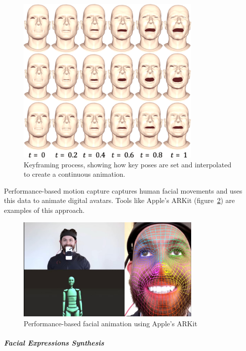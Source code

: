 \documentclass[../../main.tex]{subfiles}
\begin{document}
\begin{figure}
    \centering
    \includegraphics[width=0.8\textwidth]{chapters/background_work/images/facial_keyframing.png}
    \caption{Keyframing process, showing how key poses are set and interpolated to create a continuous animation.}
    \label{ch:facial_expressions:fig:keyframing}
\end{figure}

Performance-based motion capture captures human facial movements and uses this data to animate digital avatars. Tools like Apple's ARKit (figure~\ref{ch:facial_expressions:fig:motion_capture}) are examples of this approach.

\begin{figure}
    \centering
    \includegraphics[width=0.8\textwidth]{chapters/background_work/images/facial_motion_capture.jpg}
    \caption{Performance-based facial animation using Apple's ARKit}
    \label{ch:facial_expressions:fig:motion_capture}
\end{figure}

\subparagraph{Facial Expressions Synthesis}
\label{ch:background_work:sign_language_synthesis:3d_techniques:avatar_animation:face_animation:facial_expressions_synthesis}
\end{document}
